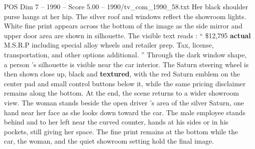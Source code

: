 \begin{textsample}{POS Dim 7 – 1990 – Score 5.00 – 1990/tv\_com\_1990\_58.txt}
Her black shoulder purse hangs at her hip.
The silver roof and windows reflect the showroom lights.
White fine print appears across the bottom of the image as the side mirror and upper door area are shown in silhouette.
The visible text reads : “ \$12,795 \textbf{actual} M.S.R.P including special alloy wheels and retailer prep.
Tax, license, transportation, and other options additional. ” Through the dark window shape, a person ’s silhouette is visible near the car interior.
The Saturn steering wheel is then shown close up, black and \textbf{textured}, with the red Saturn emblem on the center pad and small control buttons below it, while the same pricing disclaimer remains along the bottom.
At the end, the scene returns to a wider showroom view.
The woman stands beside the open driver ’s area of the silver Saturn, one hand near her face as she looks down toward the car.
The male employee stands behind and to her left near the curved counter, hands at his sides or in his pockets, still giving her space.
The fine print remains at the bottom while the car, the woman, and the quiet showroom setting hold the final image.

\end{textsample}
